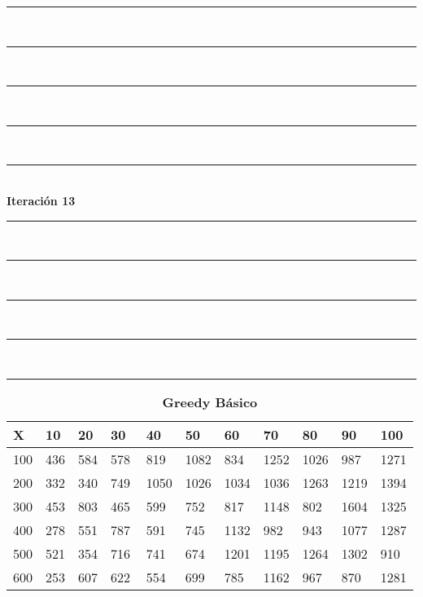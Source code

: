\documentclass[10pt,letterpaper]{article}
\begin{document}
\newpage 
\begin{center}
\newcommand{\HRule}{\rule{\linewidth}{0.5mm}}
\center
\HRule\\[6cm]
\HRule\\[0.4cm]
\HRule\\[0.4cm]
\HRule\\[0.4cm]
\HRule\\[0.4cm]
{\centering \Huge\bfseries Iteración 13}\\[0.4cm]
\HRule\\[0.4cm]
\HRule\\[0.4cm]
\HRule\\[0.4cm]
\HRule\\[6cm]
\HRule
\end{center}
\newpage 
{}
\begin{center}
\begin{table}\renewcommand{\arraystretch}{2.5}
\caption{\large \textbf{Greedy Básico}}
\centering
\begin{tabular} { |m{0.5cm}|m{1.3cm}|m{1.3cm}|m{1.3cm}|m{1.3cm}|m{1.3cm}|m{1.3cm}|m{1.3cm}|m{1.3cm}|m{1.3cm}|m{1.3cm}|} 
\hline
\rowcolor{Gray}
\centering \textbf{X} & \centering \textbf{10} & \centering \textbf{20} & \centering \textbf{30}\ & \centering \textbf{40} & \centering \textbf{50} & \centering \textbf{60}\ & \centering \textbf{70} & \centering \textbf{80} & \centering \textbf{90}\ & \textbf{100} \\\hline
\cellcolor{Gray}100 & \Large 436 & \Large 584 & \Large 578 & \Large 819 & \Large 1082 & \Large 834 & \Large 1252 & \Large 1026 & \Large 987 & \Large 1271 \\
\hline
\cellcolor{Gray}200 & \Large 332 & \Large 340 & \Large 749 & \Large 1050 & \Large 1026 & \Large 1034 & \Large 1036 & \Large 1263 & \Large 1219 & \Large 1394 \\
\hline
\cellcolor{Gray}300 & \Large 453 & \Large 803 & \Large 465 & \Large 599 & \Large 752 & \Large 817 & \Large 1148 & \Large 802 & \Large 1604 & \Large 1325 \\
\hline
\cellcolor{Gray}400 & \Large 278 & \Large 551 & \Large 787 & \Large 591 & \Large 745 & \Large 1132 & \Large 982 & \Large 943 & \Large 1077 & \Large 1287 \\
\hline
\cellcolor{Gray}500 & \Large 521 & \Large 354 & \Large 716 & \Large 741 & \Large 674 & \Large 1201 & \Large 1195 & \Large 1264 & \Large 1302 & \Large 910 \\
\hline
\cellcolor{Gray}600 & \Large 253 & \Large 607 & \Large 622 & \Large 554 & \Large 699 & \Large 785 & \Large 1162 & \Large 967 & \Large 870 & \Large 1281 \\

\end{tabular}
\end{table}
\end{center}
\end{document}
